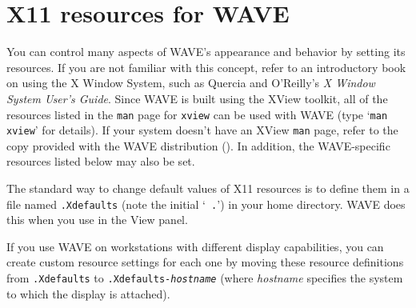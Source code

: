 \documentclass[twoside]{book}
\newcommand{\button}[1]{\cornersize{2}\ovalbox{\rule[-.3mm]{0cm}{2.5mm}\small\sf ~#1~}}
\newcommand{\WAVE}{{\sf WAVE}\xspace}
\begin{document}
\section{X11 resources for \WAVE{}}

\label{sec:resources}
You can control many aspects of \WAVE{}'s appearance and behavior by
setting its resources.  If you are not familiar with this concept, refer to an
introductory book on using the X Window System, such as Quercia and O'Reilly's
{\it X Window System User's Guide}.  Since \WAVE{} is built using the XView
toolkit,
all of the resources listed in the {\tt man} page for {\tt xview}
can be used with \WAVE{} (type `{\tt man xview}' for details).
If your system doesn't have an XView {\tt man} page, refer to the copy provided
with the \WAVE{} distribution
().
In addition, the \WAVE{}-specific resources listed below may also be set.

The standard way to change default values of X11 resources is to
define them in a file named {\tt .Xdefaults} (note the initial `{\tt
.}') in your home directory.  \WAVE{} does this when you use
\button{Save as new defaults} in the {\sf View} panel.

If you use \WAVE{} on workstations with different display capabilities, you can
create custom resource settings for each one by moving these resource
definitions from {\tt .Xdefaults} to {\tt .Xdefaults-{\it hostname}} (where
{\it hostname} specifies the system to which the display is attached).
\end{document}

